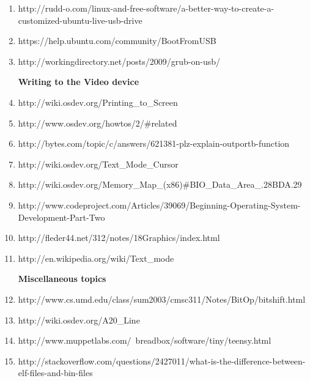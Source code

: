 \documentclass[11pt]{article}
\begin{document}
\begin{enumerate}
  \item  {http://rudd-o.com/linux-and-free-software/a-better-way-to-create-a-customized-ubuntu-live-usb-drive}
  
  \item  {https://help.ubuntu.com/community/BootFromUSB}
  
  \item  {http://workingdirectory.net/posts/2009/grub-on-usb/}
  
   \vspace {3 mm}
  
  \textbf{ Writing to the Video device }
  
  \item  {http://wiki.osdev.org/Printing\_to\_Screen}
  
  \item  {http://www.osdev.org/howtos/2/\#related}
  
  \item  {http://bytes.com/topic/c/answers/621381-plz-explain-outportb-function}
  
  \item  {http://wiki.osdev.org/Text\_Mode\_Cursor}  
  
  \item  {http://wiki.osdev.org/Memory\_Map\_(x86)\#BIO\_Data\_Area\_.28BDA.29}
  
  \item  {http://www.codeproject.com/Articles/39069/Beginning-Operating-System-Development-Part-Two}
  
  \item  {http://fleder44.net/312/notes/18Graphics/index.html}
  
  \item  {http://en.wikipedia.org/wiki/Text\_mode}
  
  
  
  
    \vspace {3 mm}
  
  \textbf{ Miscellaneous topics }
  
  \item  {http://www.cs.umd.edu/class/sum2003/cmsc311/Notes/BitOp/bitshift.html}  
  
  \item  {http://wiki.osdev.org/A20\_Line}
  
  \item  {http://www.muppetlabs.com/~breadbox/software/tiny/teensy.html}
  
  \item  {http://stackoverflow.com/questions/2427011/what-is-the-difference-between-elf-files-and-bin-files}
  

\end{enumerate}
\end{document}
